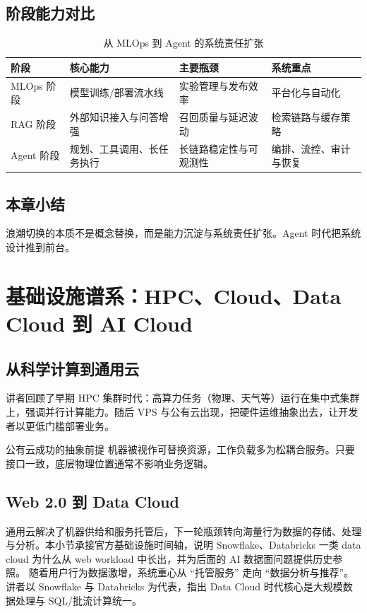 \documentclass[a4paper]{article}
\begin{document}
\subsection{阶段能力对比}
\begin{table}[H]
\centering
\begin{tabular}{p{2.8cm}p{3.6cm}p{3.6cm}p{3.2cm}}
\toprule
\textbf{阶段} & \textbf{核心能力} & \textbf{主要瓶颈} & \textbf{系统重点} \\
\midrule
MLOps 阶段 & 模型训练/部署流水线 & 实验管理与发布效率 & 平台化与自动化 \\
RAG 阶段 & 外部知识接入与问答增强 & 召回质量与延迟波动 & 检索链路与缓存策略 \\
Agent 阶段 & 规划、工具调用、长任务执行 & 长链路稳定性与可观测性 & 编排、流控、审计与恢复 \\
\bottomrule
\end{tabular}
\caption{从 MLOps 到 Agent 的系统责任扩张}
\end{table}

\subsection{本章小结}
浪潮切换的本质不是概念替换，而是能力沉淀与系统责任扩张。Agent 时代把系统设计推到前台。

\section{基础设施谱系：HPC、Cloud、Data Cloud 到 AI Cloud}

\subsection{从科学计算到通用云}
讲者回顾了早期 HPC 集群时代：高算力任务（物理、天气等）运行在集中式集群上，强调并行计算能力。随后 VPS 与公有云出现，把硬件运维抽象出去，让开发者以更低门槛部署业务。

\begin{knowledgebox}{公有云成功的抽象前提}
机器被视作可替换资源，工作负载多为松耦合服务。只要接口一致，底层物理位置通常不影响业务逻辑。
\end{knowledgebox}

\subsection{Web 2.0 到 Data Cloud}
通用云解决了机器供给和服务托管后，下一轮瓶颈转向海量行为数据的存储、处理与分析。本小节承接官方基础设施时间轴，说明 Snowflake、Databricks 一类 data cloud 为什么从 web workload 中长出，并为后面的 AI 数据面问题提供历史参照。
随着用户行为数据激增，系统重心从 ``托管服务'' 走向 ``数据分析与推荐''。讲者以 Snowflake 与 Databricks 为代表，指出 Data Cloud 时代核心是大规模数据处理与 SQL/批流计算统一。
\end{document}
